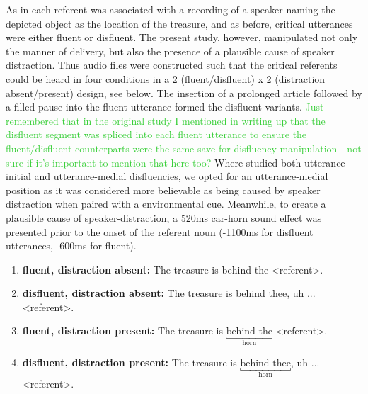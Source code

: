\documentclass[man]{apa6}
\newcommand\thenote[1]{\textcolor{LimeGreen}{#1}}
\begin{document}
As in \citet{Loy2016} each referent was associated with a recording of a speaker naming the depicted object as the location of the treasure, and as before, critical utterances were either fluent or disfluent. 
The present study, however, manipulated not only the manner of delivery, but also the presence of a plausible cause of speaker distraction. 
Thus audio files were constructed such that the critical referents could be heard in four conditions in a 2 (fluent/disfluent) x 2 (distraction absent/present) design, see below. 
The insertion of a prolonged article followed by a filled pause into the fluent utterance formed the disfluent variants.
\thenote{Just remembered that in the original study I mentioned in writing up that the disfluent segment was spliced into each fluent utterance to ensure the fluent/disfluent counterparts were the same save for disfluency manipulation - not sure if it's important to mention that here too?}
Where \citet{Loy2016} studied both utterance-initial and utterance-medial disfluencies, we opted for an utterance-medial position as it was considered more believable as being caused by speaker distraction when paired with a environmental cue.
Meanwhile, to create a plausible cause of speaker-distraction, a 520ms car-horn sound effect was presented prior to the onset of the referent noun (-1100ms for disfluent utterances, -600ms for fluent). 
\begin{enumerate}
\item \textbf{fluent, distraction absent:} The treasure is behind the \textless referent\textgreater .
\item \textbf{disfluent, distraction absent:} The treasure is behind thee, uh ... \textless referent\textgreater .
\item \textbf{fluent, distraction present:} The treasure is $\underbracket{\text{behind the}}_\text{horn}$ \textless referent\textgreater .
\item \textbf{disfluent, distraction present:} The treasure is $\underbracket{\text{behind thee}}_\text{horn}$, uh ...\textless referent\textgreater .
\end{enumerate}
\end{document}
